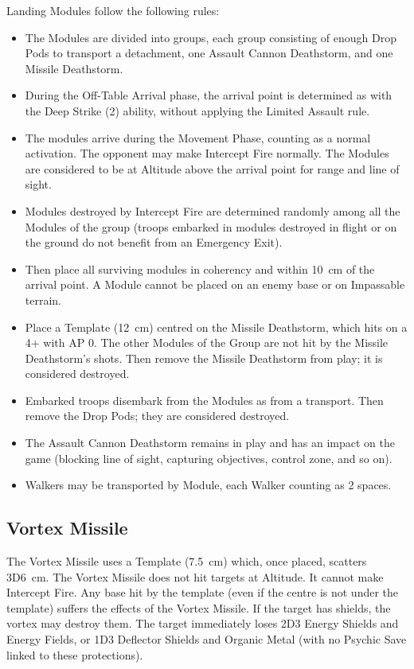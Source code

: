 Landing Modules follow the following rules:

\begin{itemize}
    \item The Modules are divided into groups, each group consisting of enough Drop Pods to transport a detachment, one Assault Cannon Deathstorm, and one Missile Deathstorm.
    \item During the Off-Table Arrival phase, the arrival point is determined as with the Deep Strike (2) ability, without applying the Limited Assault rule.
    \item The modules arrive during the Movement Phase, counting as a normal activation. The opponent may make Intercept Fire normally. The Modules are considered to be at Altitude above the arrival point for range and line of sight.
    \item Modules destroyed by Intercept Fire are determined randomly among all the Modules of the group (troops embarked in modules destroyed in flight or on the ground do not benefit from an Emergency Exit).
    \item Then place all surviving modules in coherency and within 10~cm of the arrival point. A Module cannot be placed on an enemy base or on Impassable terrain.
    \item Place a Template (12~cm) centred on the Missile Deathstorm, which hits on a 4+ with AP 0. The other Modules of the Group are not hit by the Missile Deathstorm's shots. Then remove the Missile Deathstorm from play; it is considered destroyed.
    \item Embarked troops disembark from the Modules as from a transport. Then remove the Drop Pods; they are considered destroyed.
    \item The Assault Cannon Deathstorm remains in play and has an impact on the game (blocking line of sight, capturing objectives, control zone, and so on).
    \item Walkers may be transported by Module, each Walker counting as 2 spaces.
\end{itemize}

\subsection{Vortex Missile}

The Vortex Missile uses a Template (7.5~cm) which, once placed, scatters 3D6~cm. The Vortex Missile does not hit targets at Altitude. It cannot make Intercept Fire. Any base hit by the template (even if the centre is not under the template) suffers the effects of the Vortex Missile. If the target has shields, the vortex may destroy them. The target immediately loses 2D3 Energy Shields and Energy Fields, or 1D3 Deflector Shields and Organic Metal (with no Psychic Save linked to these protections).

